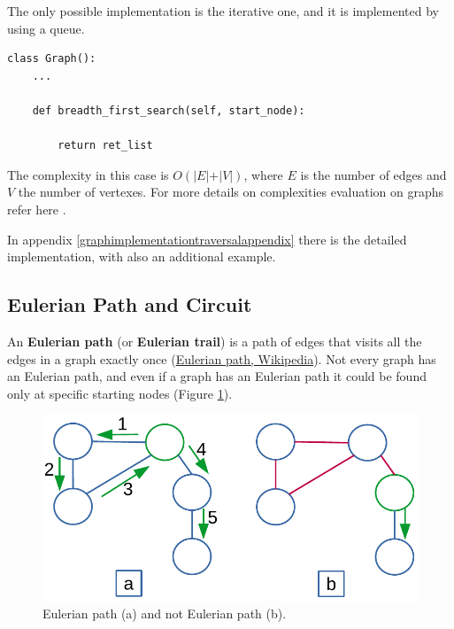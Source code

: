 The only possible implementation is the iterative one, and it is implemented by using a queue.

\begin{lstlisting}[firstnumber=1, caption={Recursive implementation of a depth-first search.}]
class Graph():
	...
	
	def breadth_first_search(self, start_node):
		
		return ret_list
\end{lstlisting}

The complexity in this case is \(O(\vert E \vert + \vert V \vert)\), where \(E\) is the number of edges and \(V\) the number of vertexes. For more details on complexities evaluation on graphs refer here \cite{goodrich2013data}.

In appendix \ref{graphimplementationtraversalappendix} there is the detailed implementation, with also an additional example.
\subsection{Eulerian Path and Circuit}
An \textbf{Eulerian path} (or \textbf{Eulerian trail}) is a path of edges that visits all the edges in a graph exactly once \cite{wikieulerianpathcircuit} (\href{https://en.wikipedia.org/wiki/Eulerian_path}{Eulerian path, Wikipedia}). Not every graph has an Eulerian path, and even if a graph has an Eulerian path it could be found only at specific starting nodes (Figure \ref{graphs_8}).

\begin{figure}[H]
	\begin{center}
		\includegraphics[scale=.6]{chapters/graphs/images/graphs_8.pdf}
		\caption[Eulerian path (a) and not Eulerian path (b).]{Eulerian path (a) and not Eulerian path (b).}
		\label{graphs_8}
	\end{center}
\end{figure}

